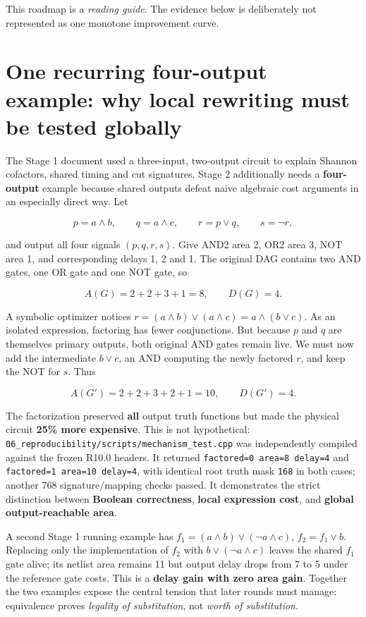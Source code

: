 This roadmap is a \emph{reading guide}. The evidence below is deliberately not represented as one monotone improvement curve.

\section{One recurring four-output example: why local rewriting must be tested globally}\label{one-recurring-four-output-example-why-local-rewriting-must-be-tested-globally}

The Stage 1 document used a three-input, two-output circuit to explain Shannon cofactors, shared timing and cut signatures. Stage 2 additionally needs a \textbf{four-output} example because shared outputs defeat naive algebraic cost arguments in an especially direct way. Let

\[
p=a\land b,\qquad q=a\land c,\qquad r=p\lor q,\qquad s=\neg r,
\]

and output all four signals \((p,q,r,s)\). Give AND2 area 2, OR2 area 3, NOT area 1, and corresponding delays 1, 2 and 1. The original DAG contains two AND gates, one OR gate and one NOT gate, so

\[
A(G)=2+2+3+1=8, \qquad D(G)=4.
\]

A symbolic optimizer notices \(r=(a\land b)\lor(a\land c)=a\land(b\lor c)\). As an isolated expression, factoring has fewer conjunctions. But because \(p\) and \(q\) are themselves primary outputs, both original AND gates remain live. We must now add the intermediate \(b\lor c\), an AND computing the newly factored \(r\), and keep the NOT for \(s\). Thus

\[
A(G')=2+2+3+2+1=10,\qquad D(G')=4.
\]

The factorization preserved \textbf{all} output truth functions but made the physical circuit \textbf{25\% more expensive}. This is not hypothetical: \texttt{06\_reproducibility/scripts/mechanism\_test.cpp} was independently compiled against the frozen R10.0 headers. It returned \texttt{factored=0\ area=8\ delay=4} and \texttt{factored=1\ area=10\ delay=4}, with identical root truth mask \texttt{168} in both cases; another 768 signature/mapping checks passed. It demonstrates the strict distinction between \textbf{Boolean correctness}, \textbf{local expression cost}, and \textbf{global output-reachable area}.

A second Stage 1 running example has \(f_1=(a\land b)\lor(\neg a\land c)\), \(f_2=f_1\lor b\). Replacing only the implementation of \(f_2\) with \(b\lor(\neg a\land c)\) leaves the shared \(f_1\) gate alive; its netlist area remains 11 but output delay drops from 7 to 5 under the reference gate costs. This is a \textbf{delay gain with zero area gain}. Together the two examples expose the central tension that later rounds must manage: equivalence proves \emph{legality of substitution}, not \emph{worth of substitution}.

